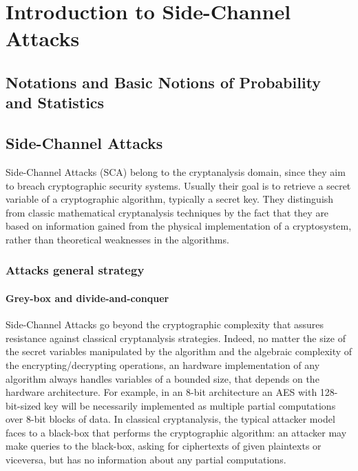 \chapter{Introduction to Side-Channel Attacks} %

\label{ChapterIntroductionSCA}

\section{Notations and Basic Notions of Probability and Statistics}


\section{Side-Channel Attacks}

Side-Channel Attacks (SCA) belong to the cryptanalysis domain,  since they aim to breach cryptographic security systems. Usually their goal is to retrieve a secret variable of a cryptographic algorithm, typically a secret key. They distinguish from classic mathematical cryptanalysis techniques by the fact that they are based on information gained from the physical implementation of a cryptosystem, rather than theoretical weaknesses in the algorithms. 

\subsection{Attacks general strategy}
\subsubsection{Grey-box and divide-and-conquer}
Side-Channel Attacks go beyond the cryptographic complexity that assures resistance against classical cryptanalysis strategies.  Indeed, no matter the size of the secret variables manipulated by the algorithm and the algebraic complexity of the encrypting/decrypting operations, an hardware implementation of any algorithm always handles variables of a bounded size, that depends on the hardware architecture. For example, in an 8-bit architecture an AES with 128-bit-sized key will be necessarily implemented as multiple partial computations over 8-bit blocks of data. In classical cryptanalysis, the typical attacker model faces to a black-box that performs the cryptographic algorithm: an attacker may make queries to the black-box, asking for ciphertexts of given plaintexts or viceversa, but has no information about any partial computations. 

